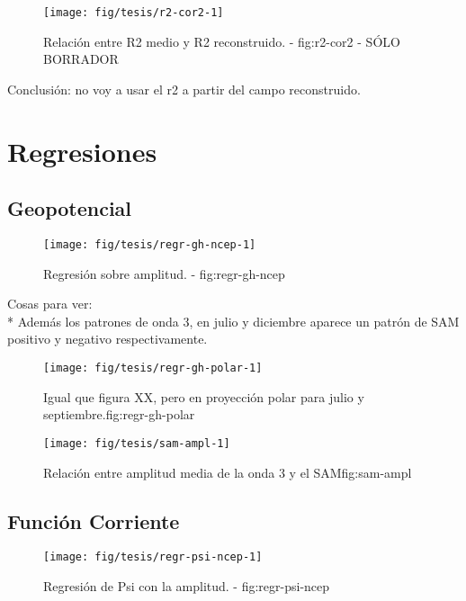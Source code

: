\documentclass[spanish,a4paper]{book}
\begin{document}

\begin{figure}
\texttt{[image: fig/tesis/r2-cor2-1]} \caption{Relación entre R2 medio y R2 reconstruido. - fig:r2-cor2 - SÓLO BORRADOR}\label{fig:r2-cor2}
\end{figure}

Conclusión: no voy a usar el r2 a partir del campo reconstruido.

\section{Regresiones}\label{regresiones}

\subsection{Geopotencial}\label{geopotencial}

\begin{figure}

{\centering \texttt{[image: fig/tesis/regr-gh-ncep-1]} 

}

\caption{Regresión sobre amplitud. - fig:regr-gh-ncep}\label{fig:regr-gh-ncep}
\end{figure}

Cosas para ver:\\
* Además los patrones de onda 3, en julio y diciembre aparece un patrón
de SAM positivo y negativo respectivamente.

\begin{figure}
\texttt{[image: fig/tesis/regr-gh-polar-1]} \caption{Igual que figura  XX, pero en proyección polar para julio y septiembre.{fig:regr-gh-polar}}\label{fig:regr-gh-polar}
\end{figure}

\begin{figure}
\texttt{[image: fig/tesis/sam-ampl-1]} \caption{Relación entre amplitud media de la onda 3 y el SAM{fig:sam-ampl}}\label{fig:sam-ampl}
\end{figure}

\subsection{Función Corriente}\label{funcion-corriente-1}

\begin{figure}

{\centering \texttt{[image: fig/tesis/regr-psi-ncep-1]} 

}

\caption{Regresión de Psi con la amplitud. - fig:regr-psi-ncep}\label{fig:regr-psi-ncep}
\end{figure}
\end{document}
